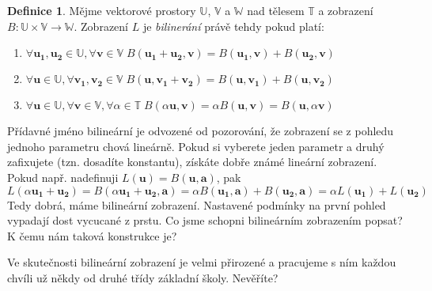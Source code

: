 \documentclass[a5paper,12pt]{amsbook}
\theoremstyle{definition}
\newtheorem{definition}{Definice}[chapter]
\newcommand{\myscalar}[1]{#1}
\newcommand{\myvec}[1]{\mathbf{#1}}
\newcommand{\myspace}[1]{\mathbb{#1}}
\newcommand{\mymap}[1]{#1}
\begin{document}
\begin{definition}
Mějme vektorové prostory $\myspace{U}$, $\myspace{V}$ a $\myspace{W}$ nad tělesem $\myspace{T}$
a zobrazení $\mymap{B}: \myspace{U}\times\myspace{V}\rightarrow\myspace{W}$. Zobrazení $\mymap{L}$ je
\textit{bilinerání} právě tehdy pokud platí:

\begin{enumerate}
  \item $\forall\myvec{u_1},\myvec{u_2}\in\myspace{U},\forall\myvec{v}\in\myspace{V}\;
    \mymap{B}(\myvec{u_1} + \myvec{u_2}, \myvec{v}) = \mymap{B}(\myvec{u_1}, \myvec{v}) + \mymap{B}(\myvec{u_2}, \myvec{v})$
  \item $\forall\myvec{u}\in\myspace{U},\forall\myvec{v_1},\myvec{v_2}\in\myspace{V}\;
    \mymap{B}(\myvec{u}, \myvec{v_1} + \myvec{v_2}) = \mymap{B}(\myvec{u}, \myvec{v_1}) + \mymap{B}(\myvec{u}, \myvec{v_2})$
  \item $\forall\myvec{u}\in\myspace{U},\forall\myvec{v}\in\myspace{V},\forall\myscalar{\alpha}\in\myspace{T}\;
    \mymap{B}(\myscalar{\alpha}\myvec{u}, \myvec{v}) = \myscalar{\alpha}\mymap{B}(\myvec{u}, \myvec{v}) =
      \mymap{B}(\myvec{u}, \myscalar{\alpha}\myvec{v})$
\end{enumerate}

\end{definition}

\noindent
Přídavné jméno bilineární je odvozené od pozorování, že zobrazení se z pohledu jednoho parametru chová lineárně.
Pokud si vyberete jeden parametr a druhý zafixujete (tzn. dosadíte konstantu), získáte dobře známé lineární
zobrazení. Pokud např. nadefinuji $\mymap{L}(\myvec{u}) = \mymap{B}(\myvec{u}, \myvec{a})$, pak
\begin{equation*}
\mymap{L}(\myscalar{\alpha}\myvec{u_1} + \myvec{u_2}) = \mymap{B}(\myscalar{\alpha}\myvec{u_1} + \myvec{u_2}, \myvec{a})
  = \myscalar{\alpha}\mymap{B}(\myvec{u_1}, \myvec{a}) + \mymap{B}(\myvec{u_2}, \myvec{a})
  = \myscalar{\alpha}\mymap{L}(\myvec{u_1}) + \mymap{L}(\myvec{u_2})
\end{equation*}
Tedy dobrá, máme bilineární zobrazení. Nastavené podmínky na první pohled vypadají dost vycucané z prstu.
Co jsme schopni bilineárním zobrazením popsat? K čemu nám taková konstrukce je?

Ve skutečnosti bilineární zobrazení je velmi přirozené a pracujeme s ním každou chvíli už někdy od druhé třídy
základní školy. Nevěříte?
\end{document}
